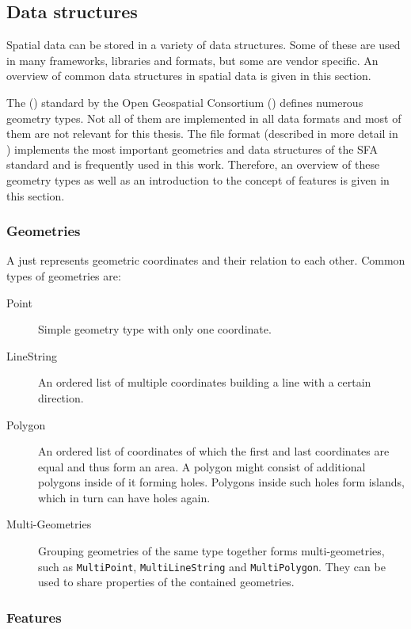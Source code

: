 	\subsection{Data structures}
	\label{subsec:data-structures}
	
		Spatial data can be stored in a variety of data structures.
		Some of these are used in many frameworks, libraries and formats, but some are vendor specific.
		An overview of common data structures in spatial data is given in this section.
		
		The  () standard by the Open Geospatial Consortium () defines numerous geometry types\cite{ogc-sfa}.
		Not all of them are implemented in all data formats and most of them are not relevant for this thesis.
		The  file format (described in more detail in ) implements the most important geometries and data structures of the SFA standard and is frequently used in this work.
		Therefore, an overview of these geometry types as well as an introduction to the concept of features is given in this section.
		
		\subsubsection{Geometries}
		
			A  just represents geometric coordinates and their relation to each other.
			Common types of geometries are:
			\begin{description}
				\item[Point] Simple geometry type with only one coordinate.
				\item[LineString] An ordered list of multiple coordinates building a line with a certain direction.
				\item[Polygon] An ordered list of coordinates of which the first and last coordinates are equal and thus form an area. A polygon might consist of additional polygons inside of it forming holes. Polygons inside such holes form islands, which in turn can have holes again.
				\item[Multi-Geometries] Grouping geometries of the same type together forms multi-geometries, such as \texttt{MultiPoint}, \texttt{MultiLineString} and \texttt{MultiPolygon}. They can be used to share properties of the contained geometries.
			\end{description}
		
		\subsubsection{Features}
		
